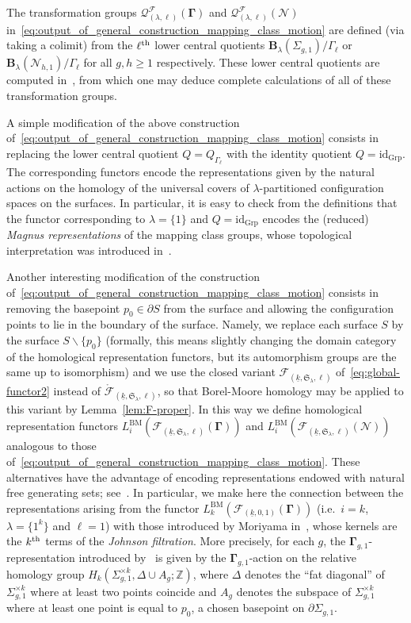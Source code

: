 \documentclass[AHL,Unicode,published]{cedram}
\newcommand{\id}{\mathrm{id}}
\newcommand{\BM}{\mathrm{BM}}
\newcommand{\Int}{\mathring}
\newcommand{\groups}{\ensuremath{\mathrm{Grp}}}
\newcommand{\B}{\ensuremath{\mathbf{B}}}
\newcommand{\MCGo}{\mathbf{\Gamma}}
\newcommand{\MCGno}{\boldsymbol{\mathcal{N}}}
\newcommand{\LCS}{\varGamma}
\newcommand{\Sym}{\mathfrak{S}}
\newcommand{\N}{\mathscr{N}}
\newcommand{\cF}{\mathcal{F}}
\newcommand{\cQ}{\mathcal{Q}}
\newcommand{\bZ}{\mathbb{Z}}
\renewcommand{\geq}{\geqslant}
\begin{document}
The transformation groups $\cQ^{\cF}_{(\lambda,\ell)}(\MCGo)$ and $\cQ^{\cF}_{(\lambda,\ell)}(\MCGno)$ in~\eqref{eq:output_of_general_construction_mapping_class_motion} are defined (via taking a colimit) from the $\ell^{\rm th}$ lower central quotients $\B_{\lambda}(\Sigma_{g,1})/\LCS_{\ell}$ or $\B_{\lambda}(\N_{h,1})/\LCS_{\ell}$ for all $g,h\geq 1$ respectively. These lower central quotients are computed in~\cite[\S~6.5--\S~6.6]{DPS}, from which one may deduce complete calculations of all of these transformation groups.

A simple modification of the above construction of~\eqref{eq:output_of_general_construction_mapping_class_motion} consists in replacing the lower central quotient $Q = Q_{\LCS_{\ell}}$ with the identity quotient $Q = \id_{\groups}$. The corresponding functors encode the representations given by the natural actions on the homology of the universal covers of $\lambda$-partitioned configuration spaces on the surfaces. In particular, it is easy to check from the definitions that the functor corresponding to $\lambda = \boldsymbol{\{} 1 \boldsymbol{\}}$ and $Q = \id_{\groups}$ encodes the (reduced) \emph{Magnus representations} of the mapping class groups, whose topological interpretation was introduced in~\cite{Suzuki}.

Another interesting modification of the construction of~\eqref{eq:output_of_general_construction_mapping_class_motion} consists in removing the basepoint $p_{0} \in \partial S$ from the surface and allowing the configuration points to lie in the boundary of the surface. Namely, we replace each surface $S$ by the surface $S\smallsetminus\{ p_{0}\}$ (formally, this means slightly changing the domain category of the homological representation functors, but its automorphism groups are the same up to isomorphism) and we use the closed variant $\cF_{(\underline{k},\Sym_{\lambda},\ell)}$ of~\eqref{eq:global-functor2} instead of $\Int{\cF}_{(\underline{k},\Sym_{\lambda},\ell)}$, so that Borel-Moore homology may be applied to this variant by Lemma~\ref{lem:F-proper}. In this way we define homological representation functors $L^{\BM}_{i}(\cF_{(\underline{k},\Sym_{\lambda},\ell)}(\MCGo))$ and $L^{\BM}_{i}(\cF_{(\underline{k},\Sym_{\lambda},\ell)}(\MCGno))$ analogous to those of~\eqref{eq:output_of_general_construction_mapping_class_motion}. These alternatives have the advantage of encoding representations endowed with natural free generating sets; see~\cite[\S~2.2]{PSIIp}. In particular, we make here the connection between the representations arising from the functor $L^{\BM}_{k}(\cF_{(\underline{k},0,1)}(\MCGo))$ (i.e.~$i=k$, $\lambda = \boldsymbol{\{} 1^{k}\boldsymbol{\}}$ and $\ell = 1$) with those introduced by Moriyama in~\cite{Moriyama}, whose kernels are the $k^{\rm th}$ terms of the \emph{Johnson filtration}. More precisely, for each $g$, the $\MCGo_{g,1}$-representation introduced by~\cite{Moriyama} is given by the $\MCGo_{g,1}$-action on the relative homology group $H_{k}(\Sigma_{g,1}^{\times k}, \Delta \cup A_{g};\bZ)$, where $\Delta$ denotes the ``fat diagonal'' of $\Sigma_{g,1}^{\times k}$ where at least two points coincide and $A_{g}$ denotes the subspace of $\Sigma_{g,1}^{\times k}$ where at least one point is equal to $p_{0}$, a chosen basepoint on $\partial \Sigma_{g,1}$.
\end{document}
